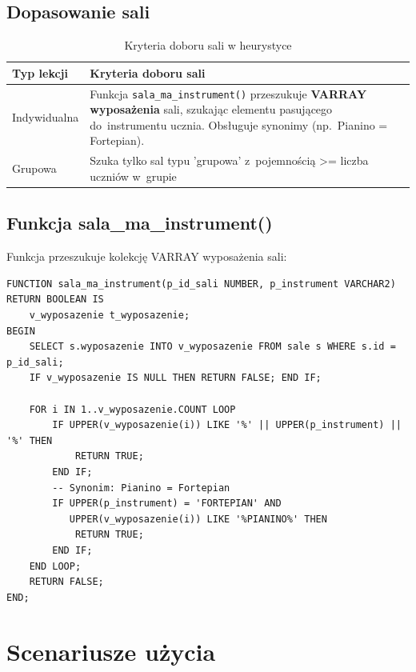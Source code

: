 \documentclass[12pt,a4paper]{article}
\begin{document}
\subsection{Dopasowanie sali}

\begin{table}[h]
\centering
\begin{tabular}{|l|p{9cm}|}
\hline
\textbf{Typ lekcji} & \textbf{Kryteria doboru sali} \\
\hline
Indywidualna & Funkcja \texttt{sala\_ma\_instrument()} przeszukuje \textbf{VARRAY wyposażenia} sali, szukając elementu pasującego do~instrumentu ucznia. Obsługuje synonimy (np.~Pianino = Fortepian). \\
\hline
Grupowa & Szuka tylko sal typu 'grupowa' z~pojemnością >= liczba uczniów w~grupie \\
\hline
\end{tabular}
\caption{Kryteria doboru sali w heurystyce}
\end{table}

\subsection{Funkcja sala\_ma\_instrument()}

Funkcja przeszukuje kolekcję VARRAY wyposażenia sali:

\begin{verbatim}
FUNCTION sala_ma_instrument(p_id_sali NUMBER, p_instrument VARCHAR2)
RETURN BOOLEAN IS
    v_wyposazenie t_wyposazenie;
BEGIN
    SELECT s.wyposazenie INTO v_wyposazenie FROM sale s WHERE s.id = p_id_sali;
    IF v_wyposazenie IS NULL THEN RETURN FALSE; END IF;

    FOR i IN 1..v_wyposazenie.COUNT LOOP
        IF UPPER(v_wyposazenie(i)) LIKE '%' || UPPER(p_instrument) || '%' THEN
            RETURN TRUE;
        END IF;
        -- Synonim: Pianino = Fortepian
        IF UPPER(p_instrument) = 'FORTEPIAN' AND
           UPPER(v_wyposazenie(i)) LIKE '%PIANINO%' THEN
            RETURN TRUE;
        END IF;
    END LOOP;
    RETURN FALSE;
END;
\end{verbatim}

\newpage
\section{Scenariusze użycia}
\end{document}
